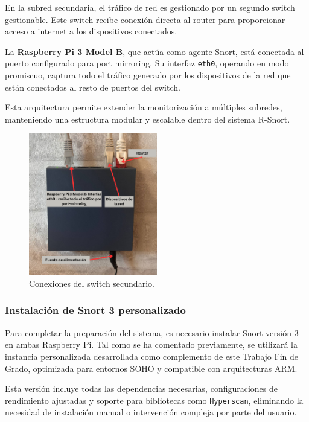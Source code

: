 \documentclass[11pt,a4paper,twoside]{report}
\begin{document}
En la subred secundaria, el tráfico de red es gestionado por un segundo switch gestionable. Este switch recibe conexión directa al router para proporcionar acceso a internet a los dispositivos conectados.\newline

La \textbf{Raspberry Pi 3 Model B}, que actúa como agente Snort, está conectada al puerto configurado para port mirroring. Su interfaz \texttt{eth0}, operando en modo promiscuo, captura todo el tráfico generado por los dispositivos de la red que están conectados al resto de puertos del switch.\newline

Esta arquitectura permite extender la monitorización a múltiples subredes, manteniendo una estructura modular y escalable dentro del sistema R-Snort.

\begin{figure}[H]
	\centering
	\includegraphics[width=0.5\textwidth]{install/0.4.png}
	\caption{Conexiones del switch secundario.}
	\label{fig:switch-subred2}
\end{figure}


\subsubsection{Instalación de Snort 3 personalizado}

Para completar la preparación del sistema, es necesario instalar Snort versión 3 en ambas Raspberry Pi. Tal como se ha comentado previamente, se utilizará la instancia personalizada desarrollada como complemento de este Trabajo Fin de Grado, optimizada para entornos SOHO y compatible con arquitecturas ARM.\newline

Esta versión incluye todas las dependencias necesarias, configuraciones de rendimiento ajustadas y soporte para bibliotecas como \texttt{Hyperscan}, eliminando la necesidad de instalación manual o intervención compleja por parte del usuario.\newline
\end{document}
